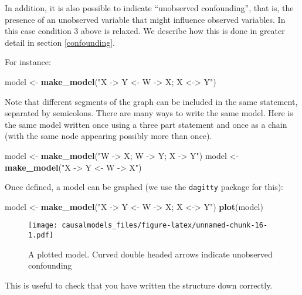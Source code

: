 \documentclass[
  12pt,
]{book}
\newenvironment{Shaded}{\begin{snugshade}}{\end{snugshade}}
\newcommand{\KeywordTok}[1]{\textcolor[rgb]{0.13,0.29,0.53}{\textbf{#1}}}
\newcommand{\NormalTok}[1]{#1}
\newcommand{\StringTok}[1]{\textcolor[rgb]{0.31,0.60,0.02}{#1}}
\begin{document}
In addition, it is also possible to indicate ``unobserved confounding'', that is, the presence of an unobserved variable that might influence observed variables. In this case condition 3 above is relaxed. We describe how this is done in greater detail in section \ref{confounding}.

For instance:

\begin{Shaded}
\begin{Highlighting}[]
\NormalTok{model <-}\StringTok{ }\KeywordTok{make_model}\NormalTok{(}\StringTok{"X -> Y <- W -> X; X <-> Y"}\NormalTok{)}
\end{Highlighting}
\end{Shaded}

Note that different segments of the graph can be included in the same statement, separated by semicolons. There are many ways to write the same model. Here is the same model written once using a three part statement and once as a chain (with the same node appearing possibly more than once).

\begin{Shaded}
\begin{Highlighting}[]
\NormalTok{model <-}\StringTok{ }\KeywordTok{make_model}\NormalTok{(}\StringTok{"W -> X; W -> Y; X -> Y"}\NormalTok{)}
\NormalTok{model <-}\StringTok{ }\KeywordTok{make_model}\NormalTok{(}\StringTok{"X -> Y <- W -> X"}\NormalTok{)}
\end{Highlighting}
\end{Shaded}

Once defined, a model can be graphed (we use the \texttt{dagitty} package for this):

\begin{Shaded}
\begin{Highlighting}[]
\NormalTok{model <-}\StringTok{ }\KeywordTok{make_model}\NormalTok{(}\StringTok{"X -> Y <- W -> X; X <-> Y"}\NormalTok{)}
\KeywordTok{plot}\NormalTok{(model)}
\end{Highlighting}
\end{Shaded}

\begin{figure}
\centering
\texttt{[image: causalmodels\_files/figure-latex/unnamed-chunk-16-1.pdf]}
\caption{\label{fig:unnamed-chunk-16}A plotted model. Curved double headed arrows indicate unobserved confounding}
\end{figure}

This is useful to check that you have written the structure down correctly.
\end{document}
